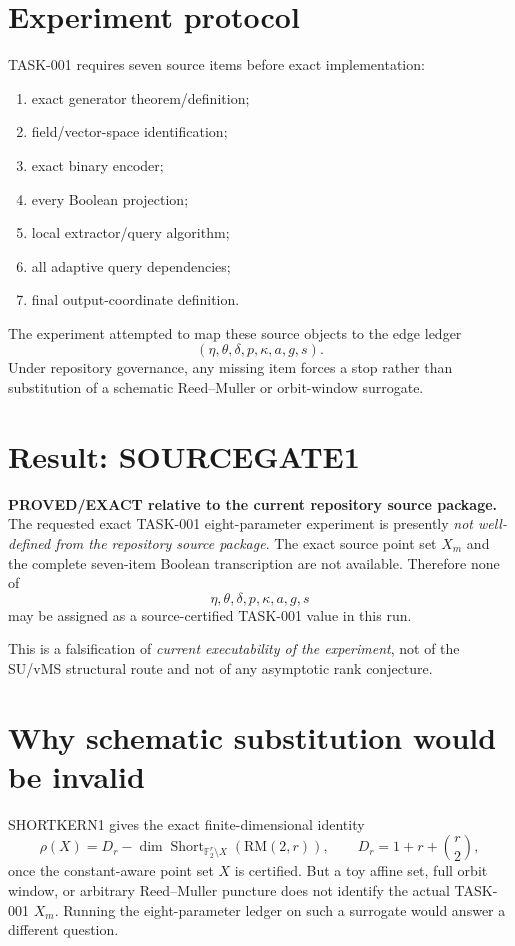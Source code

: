 \documentclass[11pt]{article}
\begin{document}
\section*{Experiment protocol}
TASK-001 requires seven source items before exact implementation:
\begin{enumerate}
\item exact generator theorem/definition;
\item field/vector-space identification;
\item exact binary encoder;
\item every Boolean projection;
\item local extractor/query algorithm;
\item all adaptive query dependencies;
\item final output-coordinate definition.
\end{enumerate}
The experiment attempted to map these source objects to the edge ledger
\[
(\eta,\theta,\delta,p,\kappa,a,g,s).
\]
Under repository governance, any missing item forces a stop rather than substitution of a schematic Reed--Muller or orbit-window surrogate.

\section*{Result: SOURCEGATE1}
\textbf{PROVED/EXACT relative to the current repository source package.}
The requested exact TASK-001 eight-parameter experiment is presently \emph{not well-defined from the repository source package}. The exact source point set \(X_m\) and the complete seven-item Boolean transcription are not available. Therefore none of
\[
\eta,\theta,\delta,p,\kappa,a,g,s
\]
may be assigned as a source-certified TASK-001 value in this run.

This is a falsification of \emph{current executability of the experiment}, not of the SU/vMS structural route and not of any asymptotic rank conjecture.

\section*{Why schematic substitution would be invalid}
SHORTKERN1 gives the exact finite-dimensional identity
\[
\rho(X)=D_r-\dim\operatorname{Short}_{\mathbb F_2^r\setminus X}(\mathrm{RM}(2,r)),
\qquad D_r=1+r+\binom r2,
\]
once the constant-aware point set \(X\) is certified. But a toy affine set, full orbit window, or arbitrary Reed--Muller puncture does not identify the actual TASK-001 \(X_m\). Running the eight-parameter ledger on such a surrogate would answer a different question.
\end{document}
